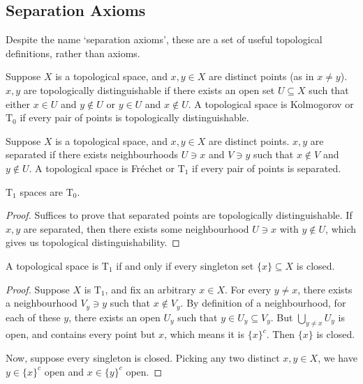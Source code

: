 \subsection*{Separation Axioms}

\begin{remark}
    Despite the name `separation axioms',
    these are a set of useful topological definitions, rather than axioms.
\end{remark}

\begin{definition}
    Suppose \(X\) is a topological space, and \(x,y \in X\) are distinct points (as in \(x \neq y\)).
    \(x,y\) are topologically distinguishable if there exists an open set \(U \subseteq X\)
    such that either \(x \in U\) and \(y \notin U\) or \(y \in U\) and \(x \notin U\).
    A topological space is Kolmogorov or \(\text{T}_0\) if every pair of points is topologically distinguishable.
\end{definition}

\begin{definition}
    Suppose \(X\) is a topological space, and \(x,y \in X\) are distinct points.
    \(x,y\) are separated if there exists neighbourhoods \(U \ni x\) and \(V \ni y\)
    such that \(x \notin V\) and \(y \notin U\).
    A topological space is Fr\'echet or \(\text{T}_1\) if every pair of points is separated.
\end{definition}
\begin{lemma}
    \(\text{T}_1\) spaces are \(\text{T}_0\).
\end{lemma}
\begin{proof}
    Suffices to prove that separated points are topologically distinguishable.
    If \(x,y\) are separated, then there exists some neighbourhood \(U \ni x\) with \(y \notin U\),
    which gives us topological distinguishability.
\end{proof}
\begin{proposition}
    A topological space is \(\text{T}_1\) if and only if every singleton set \(\{x\} \subseteq X\) is closed.
\end{proposition}
\begin{proof}
    Suppose \(X\) is \(\text{T}_1\), and fix an arbitrary \(x \in X\).
    For every \(y \neq x\), there exists a neighbourhood \(V_y \ni y\) such that \(x \notin V_y\).
    By definition of a neighbourhood, for each of these \(y\),
    there exists an open \(U_y\) such that \(y \in U_y \subseteq V_y\).
    But \(\bigcup_{y \neq x} U_y\) is open, and contains every point but \(x\),
    which means it is \({\{x\}}^c\).
    Then \(\{x\}\) is closed.

    Now, suppose every singleton is closed.
    Picking any two distinct \(x,y \in X\), we have \(y \in {\{x\}}^c\) open and \(x \in {\{y\}}^c\) open.
\end{proof}

